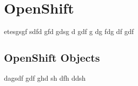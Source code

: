 \chapter{OpenShift}
etesgsgf
sdfd
gfd
gdsg
d
gdf
g
dg
fdg
df
gdf
\section{OpenShift Objects}

dagsdf
gdf
ghd
sh
dfh
ddsh
